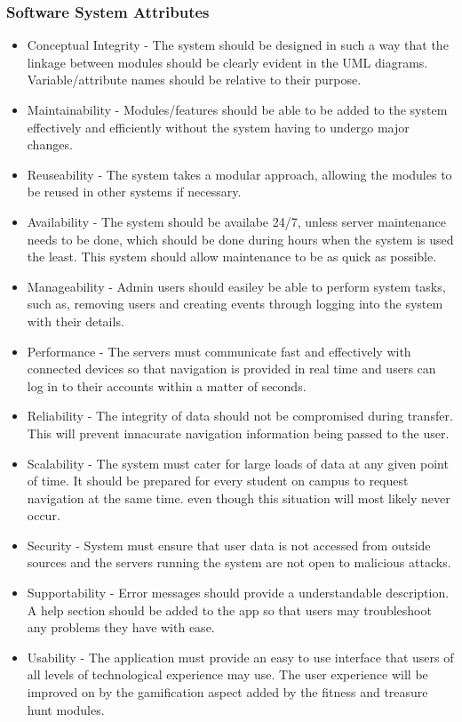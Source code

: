 \documentclass{article}
\begin{document}
\subsubsection{Software System Attributes}
\begin{itemize}
\item Conceptual Integrity - The system should be designed in such a way that the linkage between modules should be clearly evident in the UML diagrams. Variable/attribute names should be relative to their purpose.
\item Maintainability - Modules/features should be able to be added to the system effectively and efficiently without the system having to undergo major changes.
\item Reuseability - The system takes a modular approach, allowing the modules to be reused in other systems if necessary.
\item Availability - The system should be availabe 24/7, unless server maintenance needs to be done, which should be done during hours when the system is used the least. This system should allow maintenance to be as quick as possible.
\item Manageability - Admin users should easiley be able to perform system tasks, such as, removing users and creating events through logging into the system with their details.
\item Performance - The servers must communicate fast and effectively with connected devices so that navigation is provided in real time and users can log in to their accounts within a matter of seconds.
\item Reliability - The integrity of data should not be compromised during transfer. This will prevent innacurate navigation information being passed to the user.
\item Scalability - The system must cater for large loads of data at any given point of time. It should be prepared for every student on campus to request navigation at the same time. even though this situation will most likely never occur.
\item Security - System must ensure that user data is not accessed from outside sources and the servers running the system are not open to malicious attacks.
\item Supportability - Error messages should provide a understandable description. A help section should be added to the app so that users may troubleshoot any problems they have with ease.
\item Usability - The application must provide an easy to use interface that users of all levels of technological experience may use. The user experience will be improved on by the gamification aspect added by the fitness and treasure hunt modules.
\end{itemize}
\end{document}
